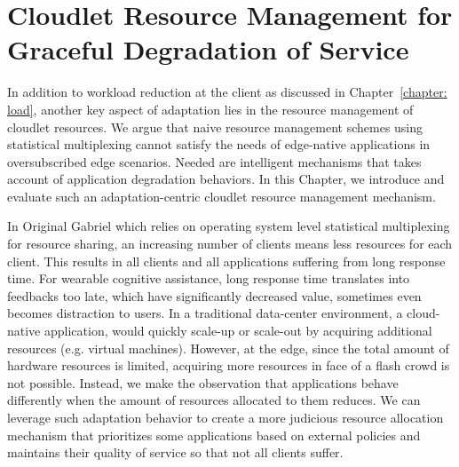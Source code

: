 \chapter{Cloudlet Resource Management for Graceful Degradation of Service}
\label{chapter: cloudlet}

In addition to workload reduction at the client as discussed in
Chapter~\ref{chapter: load}, another key aspect of adaptation lies in the
resource management of cloudlet resources. We argue that naive resource
management schemes using statistical multiplexing cannot satisfy the needs of
edge-native applications in oversubscribed edge scenarios. Needed are
intelligent mechanisms that takes account of application degradation behaviors.
In this Chapter, we introduce and evaluate such an adaptation-centric cloudlet
resource management mechanism.

In Original Gabriel which relies on operating system level statistical
multiplexing for resource sharing, an increasing number of clients means less
resources for each client. This results in all clients and all applications
suffering from long response time. For wearable cognitive assistance, long
response time translates into feedbacks too late, which have significantly
decreased value, sometimes even becomes distraction to users. In a traditional
data-center environment, a cloud-native application, would quickly scale-up or
scale-out by acquiring additional resources (e.g. virtual machines). However, at
the edge, since the total amount of hardware resources is limited, acquiring
more resources in face of a flash crowd is not possible. Instead, we make the
observation that applications behave differently when the amount of resources
allocated to them reduces. We can leverage such adaptation behavior to create a
more judicious resource allocation mechanism that prioritizes some applications
based on external policies and maintains their quality of service so that not
all clients suffer.







% 